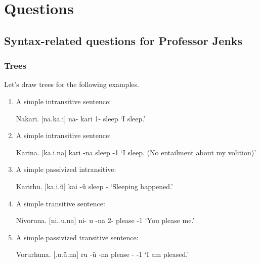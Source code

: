 \chapter{Questions}

\section{Syntax-related questions for Professor Jenks}
	\subsection{Trees}
	Let's draw trees for the following examples.
		\begin{enumerate}
			\item A simple intransitive sentence:
				\begin{example}
				\label{simple_intrans}
					Nakari. [na.\stress ka.\R i]
					\gll na- kari
					1- sleep
					\glt `I sleep.'
					\glend
				\end{example}
			\item A simple intransitive sentence:
				\begin{example}
				\label{simple_intrans_erg}
					Karina. [ka.\stress\R i.na]
					\gll kari -na
					sleep -1
					\glt `I sleep. (No entailment about my volition)'
					\glend
				\end{example}

			\item A simple passivized intransitive:
				\begin{example}
				\label{intrans_pass}
					Karirhu. [ka.\stress\R i.\G u]
					\gll ka\R i -\G u
					sleep -\D{pass}
					\glt `Sleeping happened.'
					\glend
				\end{example}

			\item A simple transitive sentence:
				\begin{example}
				\label{simple_trans}
					Nivoruna. [ni.\stress\B\OO.\R u.na]
					\gll ni- \B\OO\R u -na
					2- please -1
					\glt `You please me.'
					\glend
				\end{example}

			\item A simple passivized transitive sentence:
				\begin{example}
				\label{trans_pass}
					Vorurhuna. [\B\OO.\stress\R u.\G u.na]
					\gll \B\OO ru -\G u -na
					please - -1
					\glt `I am pleased.'
					\glend
				\end{example}


\end{enumerate}
